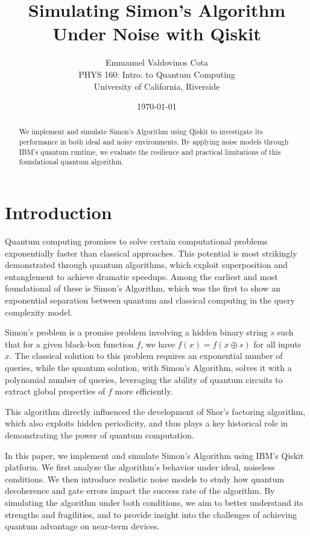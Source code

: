 \documentclass[12pt]{article}
\title{\textbf{Simulating Simon's Algorithm Under Noise with Qiskit}}
\author{Emmanuel Valdovinos Cota \\ PHYS 160: Intro. to Quantum Computing \\ University of California, Riverside}
\date{\today}
\begin{document}
\maketitle

\begin{abstract}
We implement and simulate Simon’s Algorithm using Qiskit to investigate its performance in both ideal and noisy environments. By applying noise models through IBM’s quantum runtime, we evaluate the resilience and practical limitations of this foundational quantum algorithm.
\end{abstract}

\section*{Introduction}

Quantum computing promises to solve certain computational problems exponentially faster than classical approaches. This potential is most strikingly demonstrated through quantum algorithms, which exploit superposition and entanglement to achieve dramatic speedups. Among the earliest and most foundational of these is Simon's Algorithm, which was the first to show an exponential separation between quantum and classical computing in the query complexity model.

Simon's problem is a promise problem involving a hidden binary string $s$ such that for a given black-box function $f$, we have $f(x) = f(x \oplus s)$ for all inputs $x$. The classical solution to this problem requires an exponential number of queries, while the quantum solution, with Simon's Algorithm, solves it with a polynomial number of queries, leveraging the ability of quantum circuits to extract global properties of $f$ more efficiently.

This algorithm directly influenced the development of Shor’s factoring algorithm, which also exploits hidden periodicity, and thus plays a key historical role in demonstrating the power of quantum computation.

In this paper, we implement and simulate Simon’s Algorithm using IBM’s Qiskit platform. We first analyze the algorithm’s behavior under ideal, noiseless conditions. We then introduce realistic noise models to study how quantum decoherence and gate errors impact the success rate of the algorithm. By simulating the algorithm under both conditions, we aim to better understand its strengths and fragilities, and to provide insight into the challenges of achieving quantum advantage on near-term devices.
\end{document}
